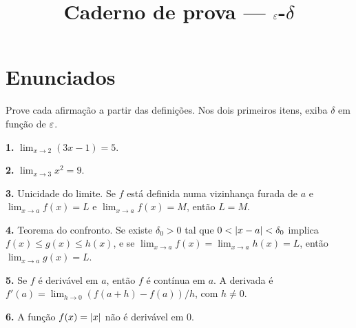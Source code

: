 \documentclass[11pt,a4paper]{article}
\title{Caderno de prova --- $\varepsilon$-$\delta$}
\author{}
\date{}
\begin{document}
\maketitle
\tableofcontents

\section{Enunciados}

Prove cada afirma\c{c}\~ao a partir das defini\c{c}\~oes. Nos dois primeiros itens, exiba $\delta$ em fun\c{c}\~ao de $\varepsilon$.

\textbf{1.} $\displaystyle\lim_{x\to 2}(3x-1)=5$.

\vspace{6.5cm}

\textbf{2.} $\displaystyle\lim_{x\to 3}x^2=9$.

\vspace{6.5cm}

\textbf{3.} Unicidade do limite. Se $f$ est\'a definida numa vizinhan\c{c}a furada de $a$ e $\lim_{x\to a}f(x)=L$ e $\lim_{x\to a}f(x)=M$, ent\~ao $L=M$.

\vspace{6.5cm}

\textbf{4.} Teorema do confronto. Se existe $\delta_0>0$ tal que $0<\left\lvert x-a \right\rvert<\delta_0$ implica $f(x)\le g(x)\le h(x)$, e se $\lim_{x\to a}f(x)=\lim_{x\to a}h(x)=L$, ent\~ao $\lim_{x\to a}g(x)=L$.

\vspace{6.5cm}

\textbf{5.} Se $f$ \'e deriv\'avel em $a$, ent\~ao $f$ \'e cont\'inua em $a$. A derivada \'e $f'(a)=\lim_{h\to 0}(f(a+h)-f(a))/h$, com $h\neq 0$.

\vspace{6.5cm}

\textbf{6.} A fun\c{c}\~ao $f(x)=\left\lvert x \right\rvert$ n\~ao \'e deriv\'avel em $0$.

\vspace{6.5cm}
\end{document}
